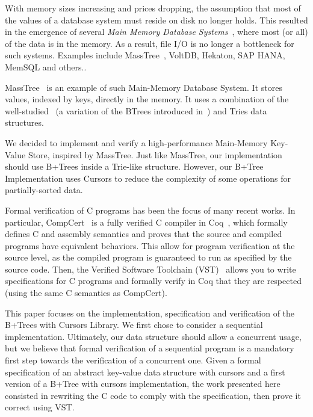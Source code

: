   With memory sizes increasing and prices dropping, the assumption that most of the values of a database system must reside on disk no longer holds.
  This resulted in the emergence of several \textit{Main Memory Database Systems}~\cite{mmdb}, where most (or all) of the data is in the memory.
  As a result, file I/O is no longer a bottleneck for such systems.
  Examples include MassTree~\cite{masstree}, VoltDB, Hekaton, SAP HANA, MemSQL and others..

  MassTree~\cite{masstree} is an example of such Main-Memory Database System.
  It stores values, indexed by keys, directly in the memory.
  It uses a combination of the well-studied \btrees\ (a variation of the BTrees introduced in~\cite{btrees}) and Tries data structures.

  We  decided to implement and verify a high-performance Main-Memory Key-Value Store, inspired by MassTree.
  Just like MassTree, our implementation should use B+Trees inside a Trie-like structure.
  However, our B+Tree Implementation uses Cursors to reduce the complexity of some operations for partially-sorted data.

  Formal verification of C programs has been the focus of many recent works.
  In particular, CompCert~\cite{compcert,compcert2} is a fully verified C compiler in Coq~\cite{coq}, which formally defines C and assembly semantics and proves that the source and compiled programs have equivalent behaviors.
  This allow for program verification at the source level, as the compiled program is guaranteed to run as specified by the source code.
  Then, the Verified Software Toolchain (VST)~\cite{vst} allows you to write specifications for C programs and formally verify in Coq that they are respected (using the same C semantics as CompCert).

  This paper focuses on the implementation, specification and verification of the B+Trees with Cursors Library. We first chose to consider a sequential implementation.
  Ultimately, our data structure should allow a concurrent usage, but we believe that formal verification of a sequential program is a mandatory first step towards the verification of a concurrent one.
  Given a formal specification of an abstract key-value data structure with cursors and a first version of a B+Tree with cursors implementation, the work presented here consisted in rewriting the C code to comply with the specification, then prove it correct using VST.

